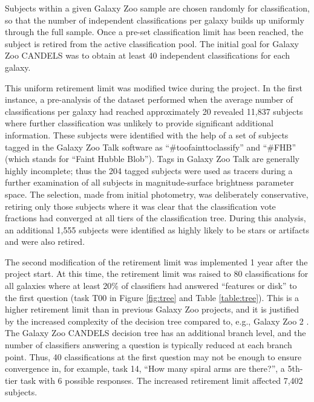 \documentclass[useAMS,usenatbib]{mn2e}
\begin{document}
{Subjects within a given Galaxy Zoo sample are chosen randomly for classification, so that the number of independent classifications per galaxy builds up uniformly through the full sample. Once a pre-set classification limit has been reached, the subject is retired from the active classification pool. The initial goal for Galaxy Zoo CANDELS was to obtain at least 40 independent classifications for each galaxy. 

This uniform retirement limit was modified twice during the project. In the first instance, a pre-analysis of the dataset performed when the average number of classifications per galaxy had reached approximately 20 revealed 11,837 subjects where further classification was unlikely to provide significant additional information. These subjects were identified with the help of a set of subjects tagged in the Galaxy Zoo Talk software as ``\#toofainttoclassify'' and ``\#FHB'' (which stands for ``Faint Hubble Blob''). Tags in Galaxy Zoo Talk are generally highly incomplete; thus the 204 tagged subjects were used as tracers during a further examination of all subjects in magnitude-surface brightness parameter space. The selection, made from initial photometry, was deliberately conservative, retiring only those subjects where it was clear that the classification vote fractions had converged at all tiers of the classification tree. During this analysis, an additional 1,555 subjects were identified as highly likely to be stars or artifacts and were also retired.

The second modification of the retirement limit was implemented 1 year after the project start. At this time, the retirement limit was raised to 80 classifications for all galaxies where at least 20\% of classifiers had answered ``features or disk'' to the first question (task T00 in Figure \ref{fig:tree} and Table \ref{table:tree}). This is a higher retirement limit than in previous Galaxy Zoo projects, and it is justified by the increased complexity of the decision tree compared to, e.g., Galaxy Zoo 2 \citep{willett13}. The Galaxy Zoo CANDELS decision tree has an additional branch level, and the number of classifiers answering a question is typically reduced at each branch point. Thus, 40 classifications at the first question may not be enough to ensure convergence in, for example, task 14, ``How many spiral arms are there?'', a 5th-tier task with 6 possible responses. The increased retirement limit affected 7,402 subjects.

}
\end{document}
